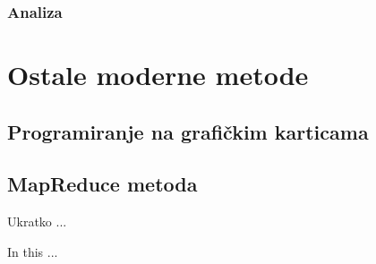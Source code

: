 \documentclass[a4paper,twoside,12pt]{memoir} %
\begin{document}
\subsection{Analiza}
\chapter{Ostale moderne metode}
\section{Programiranje na grafičkim karticama}
\section{MapReduce metoda}



\pagestyle{empty} %


\begin{sazetak}
Ukratko ...
\end{sazetak}

\begin{summary}
In this ...
\end{summary}

\end{document}
